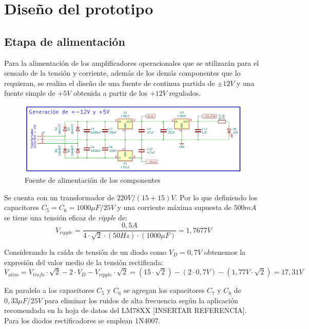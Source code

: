   \chapter{Diseño del prototipo}



\section{Etapa de alimentación} \par
Para la alimentación de los amplificadores operacionales que se utilizarán para el sensado de la tensión y corriente, además de los demás componentes que lo requieran, se realiza el diseño de una fuente de continua partida de $\pm 12V$ y una fuente simple de $+5V$ obtenida a partir de los $+12V$ regulados. \par
\begin{figure} [H]
	\centering
	\includegraphics[width=\textwidth]{./imagenes/Alimentacion_analogica.png}
	\caption{Fuente de alimentación de los componentes}
	\label{F:alimentacion_analogica}
\end{figure} \par 
Se cuenta con un transformador de $220V/(15+15)V$. Por lo que definiendo los capacitores $C_5 =C_6 =1000\mu F/25V$ y una corriente máxima supuesta de $500mA$ se tiene una tensión eficaz de \textit{ripple} de:
\begin{equation}
	V_{ripple} =\frac{0,5A}{4\cdot \sqrt{2}\cdot (50Hz)\cdot (1000\mu F)}=1,7677V
\end{equation} \par
Considerando la caída de tensión de un diodo como $V_D =0,7V$ obtenemos la expresión del valor medio de la tensión rectificada:
\begin{equation}
V_{alim} =V_{trafo} \cdot \sqrt{2}-2\cdot V_D -V_{ripple} \cdot \sqrt{2}=(15\cdot \sqrt{2})-(2\cdot 0,7V)-(1,77V\cdot \sqrt{2})=17,31V
\end{equation} \par
En paralelo a los capacitores $C_5$ y $C_6$ se agregan los capacitores $C_7$ y $C_8$ de $0,33\mu F/25V$ para eliminar los ruidos de alta frecuencia según la aplicación recomendada en la hoja de datos del LM78XX [INSERTAR REFERENCIA]. Para los diodos rectificadores se emplean 1N4007.\par
